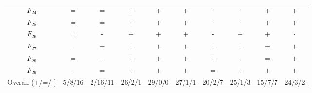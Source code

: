 \begin{center}
\begin{longtable}{cccccccccc}
$F_{24}$ & = & = & + & + & + & - & - & + & + \\
$F_{25}$ & = & = & + & + & + & - & - & + & + \\
$F_{26}$ & = & - & + & + & + & - & + & + & - \\
$F_{27}$ & - & = & + & + & + & + & + & = & + \\
$F_{28}$ & = & - & + & + & + & + & - & = & + \\
$F_{29}$ & - & = & + & + & + & = & + & + & + \\
\midrule
Overall (+/=/-) & 5/8/16 & 2/16/11 & 26/2/1 & 29/0/0 & 27/1/1 & 20/2/7 & 25/1/3 & 15/7/7 & 24/3/2 \\
\bottomrule
\end{longtable}
\end{center}